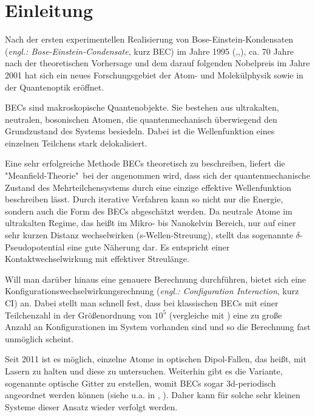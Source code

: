 \chapter{Einleitung}

Nach der ersten experimentellen Realisierung von Bose-Einstein-Kondensaten 
(\textit{engl.: Bose-Einstein-Condensate}, kurz BEC) im Jahre 1995 
(\cite{av:m2},\cite{av:m3},\cite{av:m4}), ca. 70 Jahre nach der theoretischen 
Vorhersage und dem darauf 
folgenden Nobelpreis \cite{av:m1} im Jahre 2001 hat sich ein neues 
Forschungsgebiet der Atom- und Molekülphysik sowie in der Quantenoptik 
eröffnet. 

BECs sind makroskopische Quantenobjekte. Sie bestehen aus 
ultrakalten, 
neutralen, bosonischen Atomen, die quantenmechanisch überwiegend den 
Grundzustand des Systems besiedeln. Dabei ist die Wellenfunktion eines 
einzelnen Teilchens stark delokalisiert.  

Eine sehr erfolgreiche Methode BECs theoretisch zu beschreiben, liefert die 
"Meanfield-Theorie"\ bei der angenommen wird, dass sich der quantenmechanische 
Zustand des Mehrteilchensystems durch eine einzige effektive Wellenfunktion 
beschreiben lässt. Durch iterative Verfahren kann so nicht 
nur die Energie, 
sondern auch die Form des BECs abgeschätzt werden. Da neutrale Atome im 
ultrakalten Regime, das heißt im Mikro- bis Nanokelvin 
Bereich, 
nur 
auf einer sehr 
kurzen Distanz wechselwirken (s-Wellen-Streuung), stellt das sogenannte 
$\delta$-Pseudopotential eine gute Näherung dar. Es entspricht einer 
Kontaktwechselwirkung mit effektiver Streulänge.

Will man darüber hinaus eine genauere Berechnung durchführen, bietet sich 
eine Konfigurationswechselwirkungsrechnung (\textit{engl.: Configuration 
Interaction}, kurz CI) an. Dabei stellt man schnell 
fest, dass bei klassischen BECs mit einer Teilchenzahl in der Größenordnung 
von $10^{5}$ (vergleiche mit \cite{av:m2}) eine zu große Anzahl an 
Konfigurationen im System vorhanden sind und so 
die Berechnung fast unmöglich scheint.

Seit 2011 ist es möglich, einzelne Atome in 
optischen Dipol-Fallen, das heißt, mit Lasern zu 
halten \cite{av:7a} und diese zu untersuchen. Weiterhin gibt es die Variante, 
sogenannte optische Gitter zu erstellen, womit BECs sogar 3d-periodisch 
angeordnet werden können (siehe u.a. in \cite{phdthesis:Schneider}, 
\cite{phdthesis:sala}). Daher kann für solche sehr kleinen Systeme dieser 
Ansatz wieder verfolgt werden.

